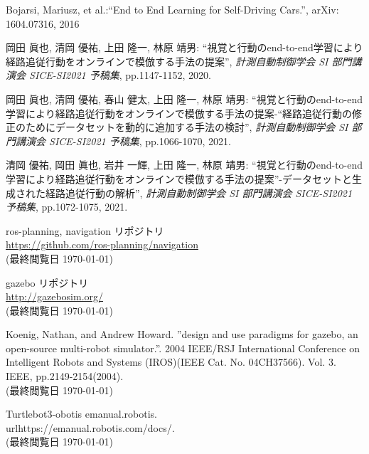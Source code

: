 \documentclass[10pt]{ujarticle}
\begin{document}
    \vspace{5truemm}
    {\footnotesize
        \begin{thebibliography}{99}

            Bojarsi, Mariusz, et al.:``End to End Learning for Self-Driving Cars.'', arXiv: 1604.07316, 2016
            
            岡田 眞也, 清岡 優祐, 上田 隆一, 林原 靖男: ``視覚と行動のend-to-end学習により経路追従行動をオンラインで模倣する手法の提案'', \textit{計測自動制御学会 SI 部門講演会 SICE-SI2021 予稿集}, pp.1147-1152, 2020.

            岡田 眞也, 清岡 優祐, 春山 健太, 上田 隆一, 林原 靖男: ``視覚と行動のend-to-end学習により経路追従行動をオンラインで模倣する手法の提案-“経路追従行動の修正のためにデータセットを動的に追加する手法の検討'', \textit{計測自動制御学会 SI 部門講演会 SICE-SI2021 予稿集}, pp.1066-1070, 2021.

            清岡 優祐, 岡田 眞也, 岩井 一輝, 上田 隆一, 林原 靖男: ``視覚と行動のend-to-end学習により経路追従行動をオンラインで模倣する手法の提案''-データセットと生成された経路追従行動の解析'', \textit{計測自動制御学会 SI 部門講演会 SICE-SI2021 予稿集}, pp.1072-1075, 2021.

            ros-planning, navigation リポジトリ\\
            \url{https://github.com/ros-planning/navigation}\\
            (最終閲覧日 \today)

            gazebo リポジトリ\\
            \url{http://gazebosim.org/}\\
            (最終閲覧日 \today)

            Koenig, Nathan, and Andrew Howard. ”design and use paradigms for gazebo, an open-source multi-robot simulator.”. 2004 IEEE/RSJ International Conference on Intelligent Robots and Systems (IROS)(IEEE Cat. No. 04CH37566). Vol. 3. IEEE, pp.2149-2154(2004).\\
            (最終閲覧日 \today)

            Turtlebot3-obotis emanual.robotis.\\
            url{https://emanual.robotis.com/docs/.}\\
            (最終閲覧日 \today)
            
        \end{thebibliography}
    }
    \normalsize
    
\end{document}
